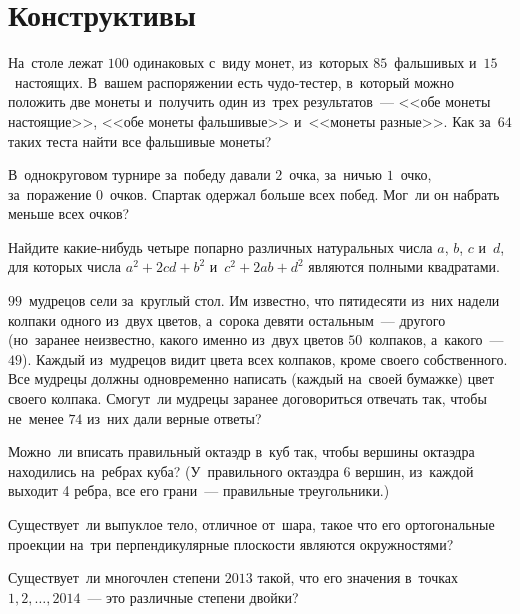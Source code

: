 
\section*{Конструктивы}


\begin{problems}

\item
На~столе лежат $100$ одинаковых с~виду монет, из~которых $85$~фальшивых
и~$15$~настоящих.
В~вашем распоряжении есть чудо-тестер, в~который можно положить две монеты
и~получить один из~трех результатов~--- <<обе монеты настоящие>>, <<обе монеты
фальшивые>> и~<<монеты разные>>.
Как за~$64$ таких теста найти все фальшивые монеты?

\item
В~однокруговом турнире за~победу давали $2$~очка, за~ничью $1$~очко,
за~поражение $0$~очков.
Спартак одержал больше всех побед.
Мог~ли он набрать меньше всех очков?

\item
Найдите какие-нибудь четыре попарно различных натуральных числа
$a$, $b$, $c$ и~$d$, для которых числа $a^2 + 2 c d + b^2$
и~$c^2 + 2 a b + d^2$ являются полными квадратами.

\item
$99$~мудрецов сели за~круглый стол.
Им известно, что пятидесяти из~них надели колпаки одного из~двух цветов,
а~сорока девяти остальным~--- другого (но~заранее неизвестно, какого именно
из~двух цветов $50$~колпаков, а~какого~--- $49$).
Каждый из~мудрецов видит цвета всех колпаков, кроме своего собственного.
Все мудрецы должны одновременно написать (каждый на~своей бумажке) цвет своего
колпака.
Смогут~ли мудрецы заранее договориться отвечать так, чтобы не~менее $74$ из~них
дали верные ответы?

\item
Можно~ли вписать правильный октаэдр в~куб так, чтобы вершины октаэдра
находились на~ребрах куба?
(У~правильного октаэдра 6 вершин, из~каждой выходит 4 ребра, все его грани~---
правильные треугольники.)

\item
Существует~ли выпуклое тело, отличное от~шара, такое что его ортогональные
проекции на~три перпендикулярные плоскости являются окружностями?

\item
Существует~ли многочлен степени $2013$ такой, что его значения в~точках
$1, 2, \ldots, 2014$~--- это различные степени двойки?

\end{problems}

